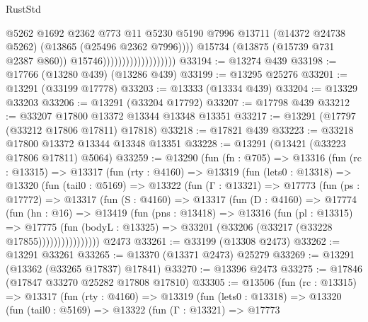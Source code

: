 \begin{lexlean}{RustStd}
\begin{coremodule}
                                              @5262
                                              @1692
                                              @2362
                                              @773
                                              @11
                                              @5230
                                              @5190
                                              @7996
                                              @13711
                                              (@14372 @24738 @5262)
                                              (@13865 (@25496 @2362 @7996))))
                                          @15734
                                          (@13875 (@15739 @731 @2387 @860))
                                          @15746)))))))))))))))))))
@33194 := @13274 @439
@33198 := @17766 (@13280 @439) (@13286 @439)
@33199 := @13295 @25276
@33201 := @13291 (@33199 @17778)
@33203 := @13333 (@13334 @439)
@33204 := @13329 @33203
@33206 := @13291 (@33204 @17792)
@33207 := @17798 @439
@33212 := @33207 @17800 @13372 @13344 @13348 @13351
@33217 := @13291 (@17797 (@33212 @17806 @17811) @17818)
@33218 := @17821 @439
@33223 := @33218 @17800 @13372 @13344 @13348 @13351
@33228 := @13291 (@13421 (@33223 @17806 @17811) @5064)
@33259 := @13290
    (fun (fn : @705) =>
    @13316
      (fun (rc : @13315) =>
      @13317
        (fun (rty : @4160) =>
        @13319
          (fun (lets0 : @13318) =>
          @13320
            (fun (tail0 : @5169) =>
            @13322
              (fun (Γ : @13321) =>
              @17773
                (fun (ps : @17772) =>
                @13317
                  (fun (S : @4160) =>
                  @13317
                    (fun (D : @4160) =>
                    @17774
                      (fun (hn : @16) =>
                      @13419
                        (fun (pns : @13418) =>
                        @13316
                          (fun (pl : @13315) =>
                          @17775
                            (fun (bodyL : @13325) =>
                            @33201 (@33206 (@33217 (@33228 @17855))))))))))))))))
    @2473
@33261 := @33199 (@13308 @2473)
@33262 := @13291 @33261
@33265 := @13370 (@13371 @2473) @25279
@33269 := @13291 (@13362 (@33265 @17837) @17841)
@33270 := @13396 @2473
@33275 := @17846 (@17847 @33270 @25282 @17808 @17810)
@33305 := @13506
    (fun (rc : @13315) =>
    @13317
      (fun (rty : @4160) =>
      @13319
        (fun (lets0 : @13318) =>
        @13320
          (fun (tail0 : @5169) =>
          @13322
            (fun (Γ : @13321) =>
            @17773

\end{coremodule}
\end{lexlean}
